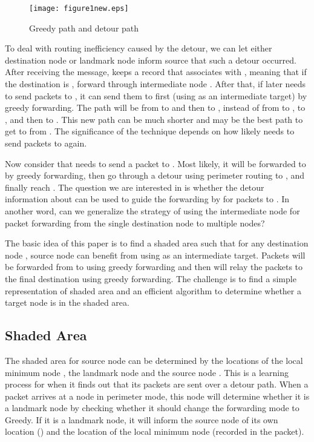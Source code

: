 \documentclass[3p,times]{elsarticle}
\begin{document}
\begin{figure}[hbt]
\centering
\texttt{[image: figure1new.eps]}
\caption{Greedy path and detour path}
\label{fig1}
\end{figure}


To deal with routing inefficiency caused by the detour,
we can let either destination node  or landmark node  inform source 
that such a detour occurred.
After receiving the message,  keeps a record that associates  with ,
meaning that if
the destination is , forward through intermediate node .
After that, if  later needs to send packets to , it
can send them to  first (using  as an intermediate target) by greedy forwarding.
The path will be from  to  and then to , instead of from  to , to , and
then to . This new path can be much shorter and may be the best path to get to  from .
The significance of the technique depends on how likely  needs to send packets to  again.

Now consider that  needs to send a packet to . Most likely, it will be forwarded to 
by greedy forwarding,
then go through a detour using perimeter routing to , and finally reach .
The question we are interested in is whether the detour information about  can be used to guide
the forwarding by  for packets to . In another word, can we generalize the strategy of
using the intermediate node  for packet forwarding from the single
destination node  to multiple nodes?

The basic idea of this paper is to find a shaded area  such that for any destination node ,
source node  can benefit from using  as an intermediate target. Packets will be forwarded from 
to  using greedy forwarding and then  will relay the packets to the final destination
using greedy forwarding. The challenge is to find a simple representation of
shaded area  and an efficient algorithm to determine whether a target node  is
in the shaded area.





\subsection{Shaded Area}



The shaded area for source node  can be determined by the
locations of
the local minimum node , the landmark node  and the source node .
This is a learning process for   when it finds out that its packets are
sent over a detour path.
When a packet arrives at a node in perimeter mode, this node will determine whether it is a landmark node
by checking whether it should change the forwarding mode to Greedy. If it is a landmark node, it will inform
the source node of its own location () and the location of the local minimum node  (recorded in
the packet).
\end{document}
